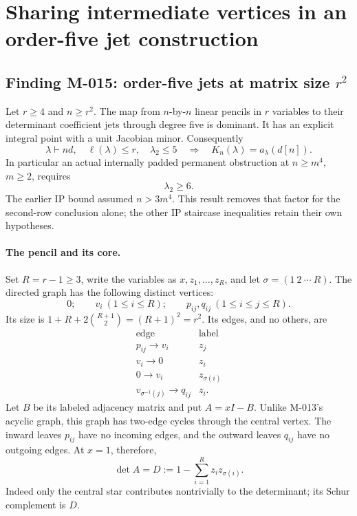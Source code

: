 \section{Sharing intermediate vertices in an order-five jet construction}

\subsection*{Finding M-015: order-five jets at matrix size \(r^2\)}
Let \(r\geq4\) and \(n\geq r^2\). The map from
\(n\)-by-\(n\) linear pencils in \(r\) variables to their
determinant coefficient jets through degree five is dominant.
It has an explicit integral point with a unit Jacobian minor.
Consequently
\begin{equation}\label{eq:M015K}
 \lambda\vdash nd,\quad\ell(\lambda)\leq r,\quad\lambda_2\leq5
       \quad\Longrightarrow\quad K_n(\lambda)=a_\lambda(d[n]).
\end{equation}
In particular an actual internally padded permanent obstruction
at \(n\geq m^4\), \(m\geq2\), requires
\begin{equation}\label{eq:M015per}
                              \lambda_2\geq6.
\end{equation}
The earlier IP bound assumed \(n>3m^4\). This result
removes that factor for the second-row conclusion alone;
the other IP staircase inequalities retain their own hypotheses.

\paragraph{The pencil and its core.}
Set \(R=r-1\geq3\), write the variables as
\(x,z_1,\ldots,z_R\), and let
\(\sigma=(1\ 2\ \cdots\ R)\). The directed graph has
the following distinct vertices:
\[
 0;\qquad v_i\ (1\leq i\leq R);\qquad
 p_{ij},q_{ij}\ (1\leq i\leq j\leq R).
\]
Its size is \(1+R+2\binom{R+1}{2}=(R+1)^2=r^2\).
Its edges, and no others, are
\[
 \begin{array}{c|c}
 \text{edge}&\text{label}\\\hline
 p_{ij}\longrightarrow v_i&z_j\\
 v_i\longrightarrow0&z_i\\
 0\longrightarrow v_i&z_{\sigma(i)}\\
 v_{\sigma^{-1}(j)}\longrightarrow q_{ij}&z_i.
 \end{array}                                             \tag{M-015.1}
\]
Let \(B\) be its labeled adjacency matrix and put
\(A=xI-B\). Unlike M-013's acyclic graph, this graph has
two-edge cycles through the central vertex. The inward leaves
\(p_{ij}\) have no incoming edges, and the outward leaves
\(q_{ij}\) have no outgoing edges. At \(x=1\), therefore,
\[
        \det A=D:=1-\sum_{i=1}^R z_i z_{\sigma(i)}.
                                                               \tag{M-015.2}
\]
Indeed only the central star contributes nontrivially to
the determinant; its Schur complement is \(D\).

